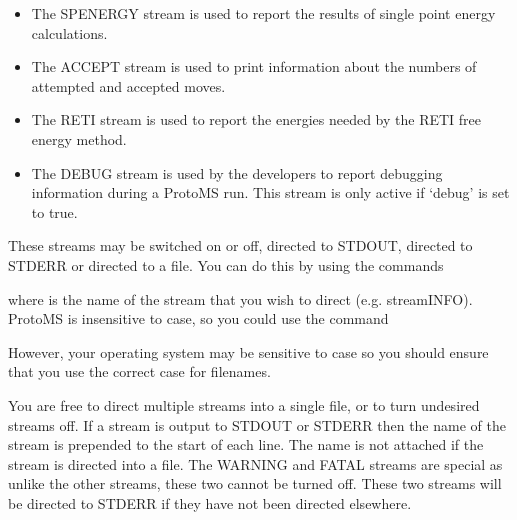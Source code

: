 \documentclass[letterpaper,10pt,english]{sphinxmanual}
\begin{document}
\begin{itemize}
\item {} 
 The SPENERGY stream is used to report the results of single point energy calculations.

\item {} 
 The ACCEPT stream is used to print information about the numbers of attempted and accepted moves.

\item {} 
 The RETI stream is used to report the energies needed by the RETI free energy method.

\item {} 
 The DEBUG stream is used by the developers to report debugging information during a ProtoMS run. This stream is only active if ‘debug’ is set to true.

\end{itemize}

These streams may be switched on or off, directed to STDOUT, directed to STDERR or directed to a file. You can do this by using the commands

%
\begin{sphinxVerbatim}[commandchars=\\\{\}]
 

 

 

 
\end{sphinxVerbatim}

where  is the name of the stream that you wish to direct (e.g. streamINFO). ProtoMS is insensitive to case, so you could use the command

%
\begin{sphinxVerbatim}[commandchars=\\\{\}]
 
\end{sphinxVerbatim}

However, your operating system may be sensitive to case so you should ensure that you use the correct case for filenames.

You are free to direct multiple streams into a single file, or to turn undesired streams off. If a stream is output to STDOUT or STDERR then the name of the stream is prepended to the start of each line. The name is not attached if the stream is directed into a file. The WARNING and FATAL streams are special as unlike the other
streams, these two cannot be turned off. These two streams will be directed to STDERR if they have not been directed elsewhere.
\end{document}
